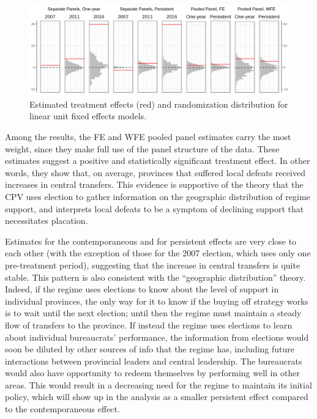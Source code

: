 \documentclass[12pt]{article}\usepackage[]{graphicx}\usepackage[]{color}
\newcommand{\1}{\mathbbm{1}}
\begin{document}
\begin{figure}[!htbp]
	\centering
	\includegraphics[width=\textwidth]{figure/SYP_FE.png}
	\captionsetup{singlelinecheck=off}
	\caption[Estimated treatment effects for linear unit fixed effects models]{Estimated treatment effects (red) and randomization distribution for linear unit fixed effects models.}
		\label{fig:FE}
	\end{figure}

Among the results, the FE and WFE pooled panel estimates carry the most weight, since they make full use of the panel structure of the data. These estimates suggest a positive and statistically significant treatment effect. In other words, they show that, on average, provinces that suffered local defeats received increases in central transfers. This evidence is supportive of the theory that the CPV uses election to gather information on the geographic distribution of regime support, and interprets local defeats to be a symptom of declining support that necessitates placation.

Estimates for the contemporaneous and for persistent effects are very close to each other (with the exception of those for the 2007 election, which uses only one pre-treatment period), suggesting that the increase in central transfers is quite stable. This pattern is also consistent with the ``geographic distribution'' theory. Indeed, if the regime uses elections to know about the level of support in individual provinces, the only way for it to know if the buying off strategy works is to wait until the next election; until then the regime must maintain a steady flow of transfers to the province.  If instead the regime uses elections to learn about individual bureaucrats' performance, the information from elections would soon be diluted by other sources of info that the regime has, including future interactions between provincial leaders and central leadership. The bureaucrats would also have opportunity to redeem themselves by performing well in other areas. This would result in a decreasing need for the regime to maintain its initial policy, which will show up in the analysis as a smaller persistent effect compared to the contemporaneous effect.
\end{document}
